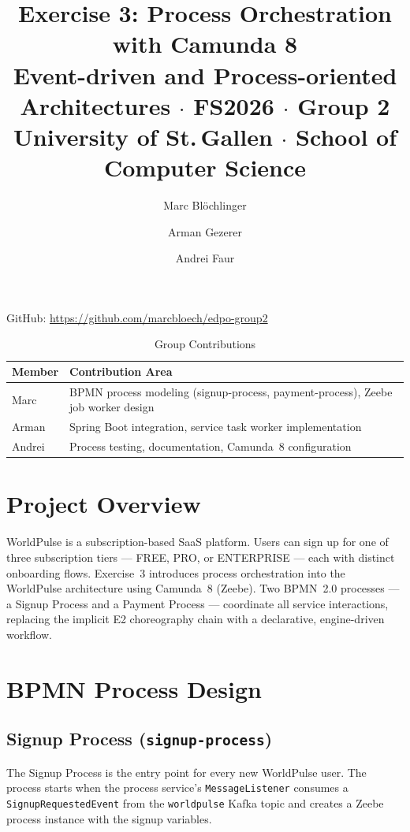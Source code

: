 \documentclass[10pt,a4paper]{article}
\title{Exercise 3: Process Orchestration with Camunda 8\\[0.5em]
\large Event-driven and Process-oriented Architectures $\cdot$ FS2026 $\cdot$ Group 2\\
University of St.\,Gallen $\cdot$ School of Computer Science}
\author{Marc Bl\"ochlinger \and Arman Gezerer \and Andrei Faur}
\date{}
\begin{document}
\maketitle

\noindent GitHub: \url{https://github.com/marcbloech/edpo-group2}

\begin{table}[h]
    \centering
    \caption{Group Contributions}
    \begin{tabular}{
        >{\raggedright\arraybackslash}p{}
        >{\raggedright\arraybackslash}p{}
    }
    \toprule
    \textbf{Member} & \textbf{Contribution Area} \\
    \midrule
    Marc   & BPMN process modeling (signup-process, payment-process), Zeebe job worker design \\
    Arman  & Spring Boot integration, service task worker implementation \\
    Andrei & Process testing, documentation, Camunda~8 configuration \\
    \bottomrule
    \end{tabular}
\end{table}


\section{Project Overview}

WorldPulse is a subscription-based SaaS platform. Users can sign up for one of three subscription tiers --- FREE, PRO, or ENTERPRISE --- each with distinct onboarding flows. Exercise~3 introduces process orchestration into the WorldPulse architecture using Camunda~8 (Zeebe). Two BPMN~2.0 processes --- a Signup Process and a Payment Process --- coordinate all service interactions, replacing the implicit E2 choreography chain with a declarative, engine-driven workflow.


\section{BPMN Process Design}

\subsection{Signup Process (\texttt{signup-process})}

The Signup Process is the entry point for every new WorldPulse user. The process starts when the process service's \texttt{MessageListener} consumes a \texttt{SignupRequestedEvent} from the \texttt{worldpulse} Kafka topic and creates a Zeebe process instance with the signup variables.
\end{document}
